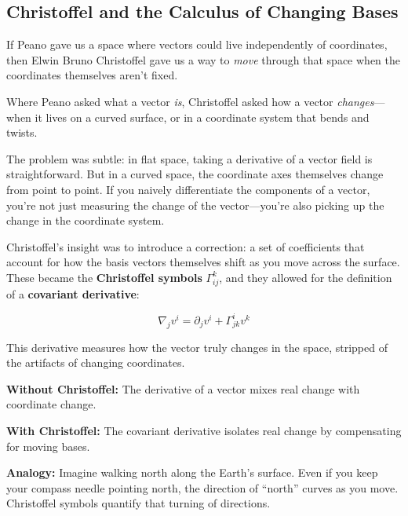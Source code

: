 \subsection{Christoffel and the Calculus of Changing Bases}

If Peano gave us a space where vectors could live independently of coordinates,  
then Elwin Bruno Christoffel gave us a way to \textit{move} through that space when the coordinates themselves aren’t fixed.

\bigskip

Where Peano asked what a vector \emph{is}, Christoffel asked how a vector \emph{changes}—when it lives on a curved surface, or in a coordinate system that bends and twists.

The problem was subtle: in flat space, taking a derivative of a vector field is straightforward. But in a curved space, the coordinate axes themselves change from point to point. If you naively differentiate the components of a vector, you’re not just measuring the change of the vector—you’re also picking up the change in the coordinate system.

\bigskip

Christoffel’s insight was to introduce a correction: a set of coefficients that account for how the basis vectors themselves shift as you move across the surface. These became the \textbf{Christoffel symbols} \( \Gamma^k_{ij} \), and they allowed for the definition of a \textbf{covariant derivative}:

\[
\nabla_j v^i = \partial_j v^i + \Gamma^i_{jk} v^k
\]

This derivative measures how the vector truly changes in the space, stripped of the artifacts of changing coordinates.

\bigskip

\begin{tcolorbox}[colback=gray!5!white, colframe=black, title=\textbf{Sidebar: Christoffel's Correction — Making Derivatives Geometric}, fonttitle=\bfseries, arc=1.5mm, boxrule=0.4pt]

\textbf{Without Christoffel:} The derivative of a vector mixes real change with coordinate change.

\textbf{With Christoffel:} The covariant derivative isolates real change by compensating for moving bases.

\medskip

\textbf{Analogy:} Imagine walking north along the Earth’s surface. Even if you keep your compass needle pointing north, the direction of “north” curves as you move. Christoffel symbols quantify that turning of directions.

\end{tcolorbox}

